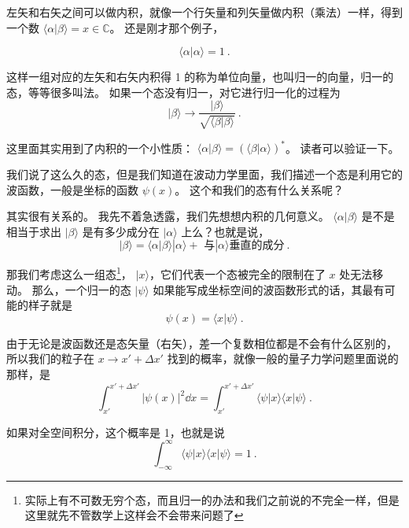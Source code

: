 左矢和右矢之间可以做内积，就像一个行矢量和列矢量做内积（乘法）一样，得到一个数 $\langle\alpha|\beta\rangle = x \in \mathbb{C}$。 还是刚才那个例子，

\begin{example}{}
\begin{equation}
\langle\alpha|\alpha\rangle = 1~.
\end{equation}
\end{example}

这样一组对应的左矢和右矢内积得 1 的称为单位向量，也叫归一的向量，归一的态，等等很多叫法。 如果一个态没有归一，对它进行归一化的过程为
\begin{equation}
|\beta\rangle\rightarrow\frac{|\beta\rangle}{\sqrt{\langle\beta|\beta\rangle}}~.
\end{equation}

这里面其实用到了内积的一个小性质： $\langle\alpha|\beta\rangle = (\langle\beta|\alpha\rangle)^*$。 读者可以验证一下。

我们说了这么久的态，但是我们知道在波动力学里面，我们描述一个态是利用它的波函数，一般是坐标的函数 $\psi(x)$。 这个和我们的态有什么关系呢？

其实很有关系的。 我先不着急透露，我们先想想内积的几何意义。 $\langle\alpha|\beta\rangle$ 是不是相当于求出 $|\beta\rangle$ 是有多少成分在 $|\alpha\rangle$ 上么？也就是说，
\begin{equation}
|\beta\rangle = \langle\alpha|\beta\rangle|\alpha\rangle + \text{ 与}|\alpha\rangle\text{垂直的成分}~.
\end{equation}

那我们考虑这么一组态\footnote{实际上有不可数无穷个态，而且归一的办法和我们之前说的不完全一样，但是这里就先不管数学上这样会不会带来问题了}， $|x\rangle$，它们代表一个态被完全的限制在了 $x$ 处无法移动。 那么，一个归一的态 $|\psi\rangle$ 如果能写成坐标空间的波函数形式的话，其最有可能的样子就是
\begin{equation}
\psi(x) = \langle x|\psi\rangle~.
\end{equation}

由于无论是波函数还是态矢量（右矢），差一个复数相位都是不会有什么区别的，所以我们的粒子在 $x\rightarrow x'+\Delta x'$ 找到的概率，就像一般的量子力学问题里面说的那样，是
\begin{equation}
\int_{x'}^{x'+\Delta x'}|\psi(x)|^2 \dd{x} = \int_{x'}^{x'+\Delta x'} \langle\psi|x\rangle\langle x|\psi\rangle~.
\end{equation}

如果对全空间积分，这个概率是 1，也就是说
\begin{equation}
\int_{-\infty}^{\infty}\langle\psi|x\rangle\langle x|\psi\rangle = 1~.
\end{equation}

